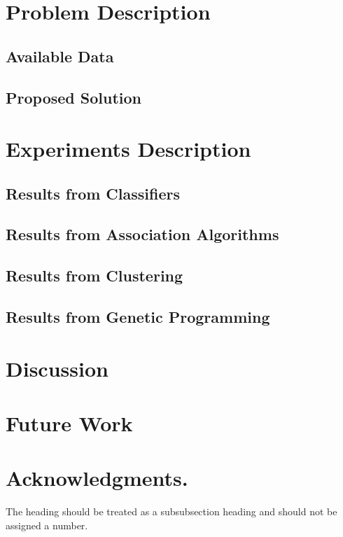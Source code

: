 \documentclass[runningheads,a4paper]{llncs}
\begin{document}
\section{Problem Description}
\label{sec:problem}

\subsection{Available Data}
\label{subsec:data}

\subsection{Proposed Solution}
\label{subsec:solution}

\section{Experiments Description}
\label{sec:experiments}

\subsection{Results from Classifiers}
\label{subsec:classifiers}

\subsection{Results from Association Algorithms}
\label{subsec:association}

\subsection{Results from Clustering}
\label{subsec:clustering}

\subsection{Results from Genetic Programming}
\label{subsec:gp}

\section{Discussion}
\label{sec:discussion}

\section{Future Work}
\label{sec:future}

\section*{Acknowledgments.} The heading should be treated as a
subsubsection heading and should not be assigned a number.



\end{document}
